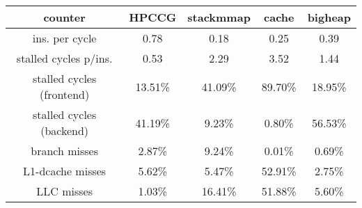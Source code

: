 \begin{tabular}{ccccc}
\toprule
counter & HPCCG & stackmmap & cache & bigheap \\
\midrule
ins. per cycle            &  0.78   &  0.18    &  0.25   &  0.39   \\
stalled cycles p/ins.     &  0.53   &  2.29    &  3.52   &  1.44   \\
stalled cycles (frontend) & 13.51\% & 41.09\%  & 89.70\% & 18.95\% \\
stalled cycles (backend)  & 41.19\% &  9.23\%  &  0.80\% & 56.53\% \\
branch misses             &  2.87\% &  9.24\%  &  0.01\% &  0.69\% \\
L1-dcache misses          &  5.62\% &  5.47\%  & 52.91\% &  2.75\% \\
LLC misses                &  1.03\% & 16.41\%  & 51.88\% &  5.60\% \\
\bottomrule
\end{tabular}
